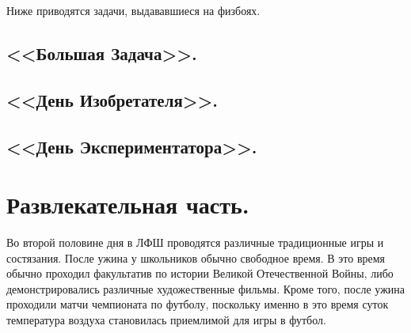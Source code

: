 \documentclass[12pt,a4paper,oneside]{scrartcl}
\begin{document}
Ниже приводятся задачи, выдававшиеся на физбоях. 









\subsection{<<Большая Задача>>.}
\label{sec:bz}

\subsection{<<День Изобретателя>>.}
\label{sec:day_inventor}

\subsection{<<День Экспериментатора>>.}
\label{sec:day_exp}


\section{Развлекательная часть.}
\label{sec:fun}

Во второй половине дня в ЛФШ проводятся различные традиционные игры и
состязания. После ужина у школьников обычно свободное время. В это
время обычно проходил факультатив по истории Великой Отечественной
Войны, либо демонстрировались различные художественные фильмы. Кроме
того, после ужина проходили матчи чемпионата по футболу, поскольку
именно в это время суток температура воздуха становилась приемлимой
для игры в футбол.
\end{document}
